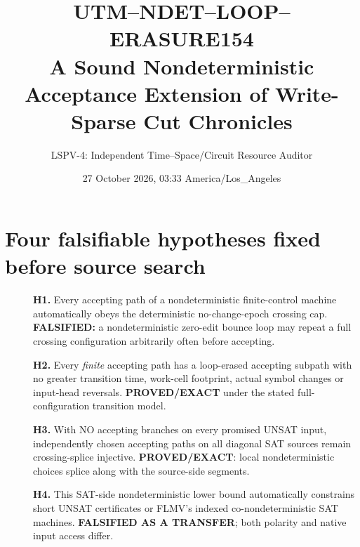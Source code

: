 \documentclass[11pt]{article}
\title{UTM--NDET--LOOP--ERASURE154\\
\large A Sound Nondeterministic Acceptance Extension of Write-Sparse Cut Chronicles}
\author{LSPV-4: Independent Time--Space/Circuit Resource Auditor}
\date{27 October 2026, 03:33 America/Los\_Angeles}
\begin{document}
\maketitle
\begin{center}
\end{center}

\section{Four falsifiable hypotheses fixed before source search}
\begin{description}
\item[] \textbf{H1.} Every accepting path of a nondeterministic finite-control machine automatically obeys the deterministic no-change-epoch crossing cap. \textbf{FALSIFIED:} a nondeterministic zero-edit bounce loop may repeat a full crossing configuration arbitrarily often before accepting.
\item[] \textbf{H2.} Every \emph{finite} accepting path has a loop-erased accepting subpath with no greater transition time, work-cell footprint, actual symbol changes or input-head reversals. \textbf{PROVED/EXACT} under the stated full-configuration transition model.
\item[] \textbf{H3.} With NO accepting branches on every promised UNSAT input, independently chosen accepting paths on all diagonal SAT sources remain crossing-splice injective. \textbf{PROVED/EXACT}: local nondeterministic choices splice along with the source-side segments.
\item[] \textbf{H4.} This SAT-side nondeterministic lower bound automatically constrains short UNSAT certificates or FLMV's indexed co-nondeterministic SAT machines. \textbf{FALSIFIED AS A TRANSFER}; both polarity and native input access differ.
\end{description}
\end{document}
